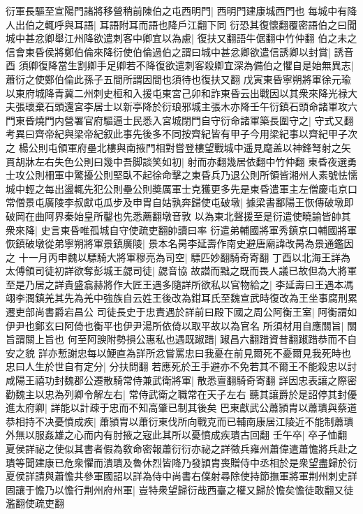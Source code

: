 衍軍長驅至宣陽門諸將移營稍前陳伯之屯西明門|{
	西明門建康城西門也}
每城中有降人出伯之輒呼與耳語|{
	耳語附耳而語也降戶江翻下同}
衍恐其復懷翻覆密語伯之曰聞城中甚忿卿舉江州降欲遣刺客中卿宜以為慮|{
	復扶又翻語牛倨翻中竹仲翻}
伯之未之信會東昏侯將鄭伯倫來降衍使伯倫過伯之謂曰城中甚忿卿欲遣信誘卿以封賞|{
	誘音酉}
須卿復降當生割卿手足卿若不降復欲遣刺客殺卿宜深為備伯之懼自是始無異志|{
	蕭衍之使鄭伯倫此孫子五間所謂因間也須待也復扶又翻}
戊寅東昏寧朔將軍徐元瑜以東府城降青冀二州刺史桓和入援屯東宮己卯和詐東昏云出戰因以其衆來降光禄大夫張瓌棄石頭還宮李居士以新亭降於衍琅邪城主張木亦降壬午衍鎮石頭命諸軍攻六門東昏燒門内營署官府驅逼士民悉入宮城閉門自守衍命諸軍築長圍守之|{
	守式又翻　考異曰齊帝紀與梁帝紀叙此事先後多不同按齊紀皆有甲子今用梁紀事以齊紀甲子次之}
楊公則屯領軍府壘北樓與南掖門相對嘗登樓望戰城中遥見麾盖以神鋒弩射之矢貫胡牀左右失色公則曰幾中吾脚談笑如初|{
	射而亦翻幾居依翻中竹仲翻}
東昏夜選勇士攻公則柵軍中驚擾公則堅臥不起徐命擊之東昏兵乃退公則所領皆湘州人素號怯懦城中輕之每出盪輒先犯公則壘公則奬厲軍士克獲更多先是東昏遣軍主左僧慶屯京口常僧景屯廣陵李叔獻屯瓜步及申胄自姑孰奔歸使屯破墩|{
	據梁書鄱陽王恢傳破墩即破岡在曲阿界秦始皇所鑿也先悉薦翻墩音敦}
以為東北聲援至是衍遣使曉諭皆帥其衆來降|{
	史言東昏唯孤城自守使疏吏翻帥讀曰率}
衍遣弟輔國將軍秀鎮京口輔國將軍恢鎮破墩從弟寧朔將軍景鎮廣陵|{
	景本名昺李延壽作南史避唐廟諱改昺為景通鑑因之}
十一月丙申魏以驃騎大將軍穆亮為司空|{
	驃匹妙翻騎奇寄翻}
丁酉以北海王詳為太傅領司徒初詳欲奪彭城王勰司徒|{
	勰音協}
故譛而黜之既而畏人議已故但為大將軍至是乃居之詳貴盛翕赫將作大匠王遇多隨詳所欲私以官物給之|{
	李延壽曰王遇本馮翊李潤鎮羌其先為羌中強族自云姓王後改為鉗耳氏至魏宣武時復改為王坐事腐刑累遷吏部尚書爵宕昌公}
司徒長史于忠責遇於詳前曰殿下國之周公阿衡王室|{
	阿衡謂如伊尹也鄭玄曰阿倚也衡平也伊尹湯所依倚以取平故以為官名}
所須材用自應關旨|{
	關旨謂關上旨也}
何至阿諛附勢損公惠私也遇既踧踖|{
	踧昌六翻踖資昔翻踧踖恭而不自安之貌}
詳亦慙謝忠每以鯁直為詳所忿嘗罵忠曰我憂在前見爾死不憂爾見我死時也忠曰人生於世自有定分|{
	分扶問翻}
若應死於王手避亦不免若其不爾王不能殺忠以討咸陽王禧功封魏郡公遷散騎常侍兼武衛將軍|{
	散悉亶翻騎奇寄翻}
詳因忠表讓之際密勸魏主以忠為列卿令解左右|{
	常侍武衛之職常在天子左右}
聽其讓爵於是詔停其封優進太府卿|{
	詳能以計疎于忠而不知高肇已制其後矣}
巴東獻武公蕭頴胄以蕭璝與蔡道恭相持不决憂憤成疾|{
	蕭頴胄以蕭衍東伐所向戰克而已輔南康居江陵近不能制蕭璝外無以服姦雄之心而内有肘掖之宼此其所以憂憤成疾璝古回翻}
壬午卒|{
	卒子恤翻}
夏侯詳祕之使似其書者假為敎命密報蕭衍衍亦祕之詳徵兵雍州蕭偉遣蕭憺將兵赴之璝等聞建康已危衆懼而潰璝及魯休烈皆降乃發頴胄喪贈侍中丞相於是衆望盡歸於衍夏侯詳請與蕭憺共參軍國詔以詳為侍中尚書右僕射尋除使持節撫軍將軍荆州刺史詳固讓于憺乃以憺行荆州府州軍|{
	豈特衆望歸衍哉西臺之權又歸於憺矣憺徒敢翻又徒濫翻使疏吏翻}
